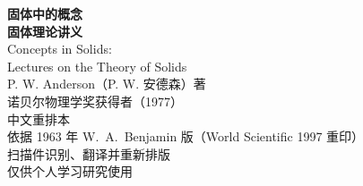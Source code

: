 \documentclass[11pt,a4paper,twoside,openright]{ctexbook}
\begin{document}
\frontmatter
\begin{titlepage}
\centering
{\Huge\bfseries 固体中的概念\\[0.6em]}
{\LARGE\bfseries 固体理论讲义\\[2.5em]}
{\Large Concepts in Solids:\\ Lectures on the Theory of Solids\\[3em]}
{\Large P. W. Anderson（P. W. 安德森）\quad 著\\[1em]}
{\large 诺贝尔物理学奖获得者（1977）\\[5em]}
{\large 中文重排本\\[0.5em]}
{\large 依据 1963 年 W.~A.~Benjamin 版（World Scientific 1997 重印）\\[0.3em]
扫描件识别、翻译并重新排版\\[0.3em]
仅供个人学习研究使用\\[3em]}
\end{titlepage}
\thispagestyle{empty}\mbox{}\clearpage
\tableofcontents



\mainmatter



%

%
\end{document}

